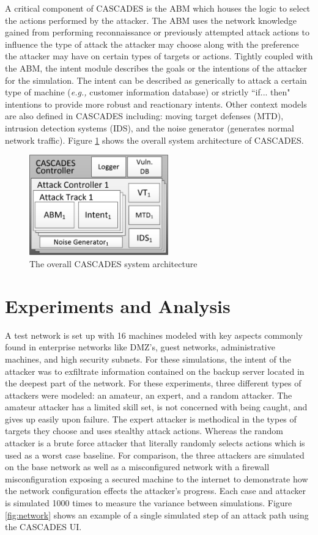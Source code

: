 \documentclass[conference]{IEEEtran}
\newcommand{\eg}  {\emph{e.g., \/}}
\begin{document}
A critical component of CASCADES is the ABM which houses the logic to select the actions performed by the attacker.  The ABM uses the network knowledge gained from performing reconnaissance or previously attempted attack actions to influence the type of attack the attacker may choose along with the preference the attacker may have on certain types of targets or actions.  Tightly coupled with the ABM, the intent module describes the goals or the intentions of the attacker for the simulation.   The intent can be described as generically to attack a certain type of machine (\eg customer information database) or strictly ``if... then" intentions to provide more robust and reactionary intents.  Other context models are also defined in CASCADES including: moving target defenses (MTD), intrusion detection systems (IDS), and the noise generator (generates normal network traffic).  Figure \ref{fig:overview} shows the overall system architecture of CASCADES.

\begin{figure}[htbp]
	\centering
	\includegraphics[width=6cm,keepaspectratio]{Figure_Overview.png}
	\caption{The overall CASCADES system architecture}
	\label{fig:overview}
\end{figure}

\section{Experiments and Analysis}
A test network is set up with 16 machines modeled with key aspects commonly found in enterprise networks like DMZ's, guest networks, administrative machines, and high security subnets. For these simulations, the intent of the attacker was to exfiltrate information contained on the backup server located in the deepest part of the network.  For these experiments, three different types of attackers were modeled: an amateur, an expert, and a random attacker. The amateur attacker has a limited skill set, is not concerned with being caught, and gives up easily upon failure.  The expert attacker is methodical in the types of targets they choose and uses stealthy attack actions.  Whereas the random attacker is a brute force attacker that literally randomly selects actions which is used as a worst case baseline.  For comparison, the three attackers are simulated on the base network as well as a misconfigured network with a firewall misconfiguration exposing a secured machine to the internet to demonstrate how the network configuration effects the attacker's progress.  Each case and attacker is simulated 1000 times to measure the variance between simulations.  Figure \ref{fig:network} shows an example of a single simulated step of an attack path using the CASCADES UI.
\end{document}
